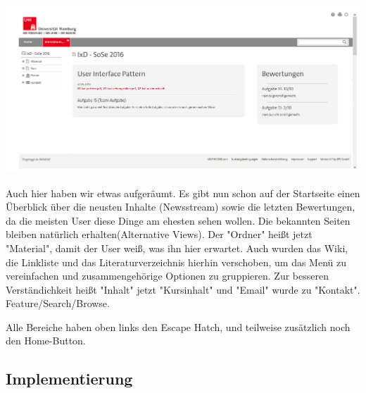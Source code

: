 ﻿\documentclass[a4paper,10pt]{article}
\begin{document}
\includegraphics[scale=0.4]{images/ixd_seite.png}

Auch hier haben wir etwas aufgeräumt. Es gibt nun schon auf der Startseite einen Überblick über die neusten Inhalte (Newsstream) sowie die letzten Bewertungen, da die meisten User diese Dinge am ehesten sehen wollen. Die bekannten Seiten bleiben natürlich erhalten(Alternative Views). Der "Ordner" heißt jetzt "Material", damit der User weiß, was ihn hier erwartet. Auch wurden das Wiki, die Linkliste und das Literaturverzeichnis hierhin verschoben, um das Menü zu vereinfachen und zusammengehörige Optionen zu gruppieren. Zur besseren Verständichkeit heißt "Inhalt" jetzt "Kursinhalt" und "Email" wurde zu "Kontakt". Feature/Search/Browse.

Alle Bereiche haben oben links den Escape Hatch, und teilweise zusätzlich noch den Home-Button. 

\subsection{Implementierung} 
\end{document}
